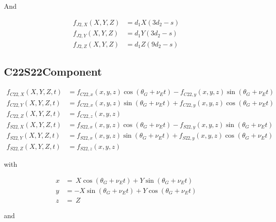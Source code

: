\documentclass{article}
\begin{document}
And

\begin{equation}
\begin{array}{ll}
f_{J2,X}(X,Y,Z) &= {d_1X\left({3d_2}-{s}\right)} \\
f_{J2,Y}(X,Y,Z) &= {d_1Y\left({3d_2}-{s}\right)} \\
f_{J2,Z}(X,Y,Z) &= {d_1Z\left({9d_2}-{s}\right)}
\end{array}
\end{equation}

\subsection{C22S22Component}

\begin{equation}
\begin{array}{ll}
f_{C22,X}(X,Y,Z,t) &= f_{C22,x}(x,y,z)\cos(\theta_G+\nu_Et) - f_{C22,y}(x,y,z)\sin(\theta_G+\nu_Et) \\
f_{C22,Y}(X,Y,Z,t) &= f_{C22,x}(x,y,z)\sin(\theta_G+\nu_Et) + f_{C22,y}(x,y,z)\cos(\theta_G+\nu_Et) \\
f_{C22,Z}(X,Y,Z,t) &= f_{C22,z}(x,y,z)\\
f_{S22,X}(X,Y,Z,t) &= f_{S22,x}(x,y,z)\cos(\theta_G+\nu_Et) - f_{S22,y}(x,y,z)\sin(\theta_G+\nu_Et) \\
f_{S22,Y}(X,Y,Z,t) &= f_{S22,x}(x,y,z)\sin(\theta_G+\nu_Et) + f_{S22,y}(x,y,z)\cos(\theta_G+\nu_Et) \\
f_{S22,Z}(X,Y,Z,t) &= f_{S22,z}(x,y,z)
\end{array}
\end{equation}

with

\begin{equation}
\begin{array}{ll}
x&=~X\cos(\theta_G+\nu_Et)+Y\sin(\theta_G+\nu_Et) \\
y&=-X\sin(\theta_G+\nu_Et)+Y\cos(\theta_G+\nu_Et) \\
z&=~Z
\end{array}
\end{equation}

and
\end{document}

